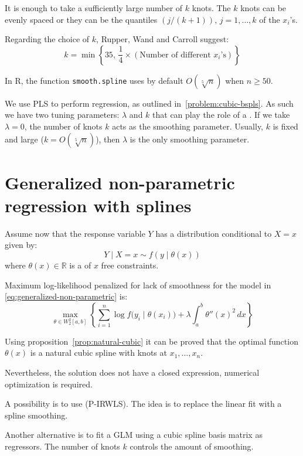 It is enough to take a sufficiently large number of $k$ knots. The
$k$ knots can be evenly spaced or they can be the quantiles
$(j/(k+1)),\,j=1,\ldots,k$ of the $x_i$'s.

Regarding the choice of $k$, Rupper, Wand and Carroll suggest:
\begin{equation*}
    k = \min \left\{
        35,\, \frac{1}{4} \times \left( \text{Number of different $x_i$'s} \right)
    \right\}
\end{equation*}

In R, the function \texttt{smooth.spline} uses by default $O\left(\sqrt[5]n\right)$ when
$n \geq 50$.

We use PLS to perform regression, as outlined in~\ref{problem:cubic-bspls}. As such we
have two tuning parameters: $\lambda$ and $k$ that can play the role
of a . If we take $\lambda=0$, the number
of knots $k$ acts as the smoothing parameter. Usually, $k$ is
fixed and large ($k = O(\sqrt[5]n)$), then $\lambda$ is the
only smoothing parameter.

\section{Generalized non-parametric regression with splines}

Assume now that the response variable $Y$ has a distribution conditional
to $X = x$ given by:
\begin{equation}\label{eq:generalized-non-parametric}
    Y \mid X=x \sim f(y \mid \theta(x))
\end{equation}
where $\theta(x) \in \mathds{R}$ is a  of
$x$ free constraints.

\begin{problem}{Maximum log-likelihood penalized for lack of smoothness}{}
    for the model in \cref{eq:generalized-non-parametric} is:
    \begin{equation*}
        \max_{\theta \in W_2^2[a,b]} \left \{
            \sum_{i=1}^n \log f\bigl(y_i \mid \theta(x_i)\bigr)
            + \lambda \int_a^b \theta''(x)^2\,dx
            \right \}
    \end{equation*}
\end{problem}

Using proposition~\ref{prop:natural-cubic} it can be proved that the optimal
function $\theta(x)$ is a natural cubic spline with knots at $x_1,\ldots,x_n$.

\begin{note}
Nevertheless, the solution does not have a closed expression, numerical
optimization is required.
\end{note}

A possibility is to use 
(P-IRWLS). The idea is to replace the linear fit
with a spline smoothing.

Another alternative is to fit a GLM using a cubic spline basis matrix as
regressors. The number of knots $k$ controls the amount of smoothing.

